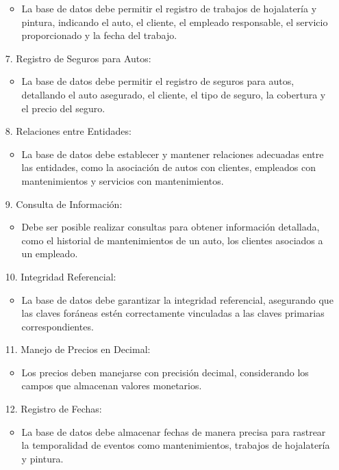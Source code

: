 \documentclass[12pt]{article}
\begin{document}
\begin{itemize}
                \begin{itemize}
                    \item La base de datos debe permitir el registro de trabajos de hojalatería y pintura, indicando el auto, el cliente, el empleado responsable, el servicio proporcionado y la fecha del trabajo.
                \end{itemize}
            \item[7.] Registro de Seguros para Autos:
                \begin{itemize}
                    \item La base de datos debe permitir el registro de seguros para autos, detallando el auto asegurado, el cliente, el tipo de seguro, la cobertura y el precio del seguro.
                \end{itemize}
            \item[8.] Relaciones entre Entidades:
                \begin{itemize}
                    \item La base de datos debe establecer y mantener relaciones adecuadas entre las entidades, como la asociación de autos con clientes, empleados con mantenimientos y servicios con mantenimientos.
                \end{itemize}
            \item[9.] Consulta de Información:
                \begin{itemize}
                    \item Debe ser posible realizar consultas para obtener información detallada, como el historial de mantenimientos de un auto, los clientes asociados a un empleado.
                \end{itemize}
            \item[10.] Integridad Referencial:
                \begin{itemize}
                    \item La base de datos debe garantizar la integridad referencial, asegurando que las claves foráneas estén correctamente vinculadas a las claves primarias correspondientes.
                \end{itemize}
            \item[11.] Manejo de Precios en Decimal:
                \begin{itemize}
                    \item Los precios deben manejarse con precisión decimal, considerando los campos que almacenan valores monetarios.
                \end{itemize}
            \item[12.] Registro de Fechas:
                \begin{itemize}
                    \item La base de datos debe almacenar fechas de manera precisa para rastrear la temporalidad de eventos como mantenimientos, trabajos de hojalatería y pintura.
                \end{itemize}
        \end{itemize}
\end{document}

